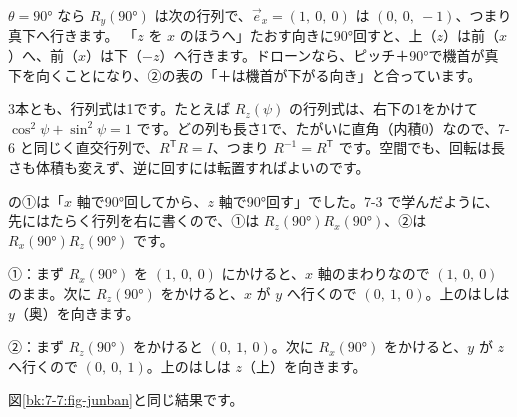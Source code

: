 $\theta=90°$ なら $R_y(90°)$ は次の行列で、$\vec e_x=(1,\ 0,\ 0)$ は $(0,\ 0,\ -1)$、つまり真下へ行きます。
「$z$ を $x$ のほうへ」たおす向きに90°回すと、上（$z$）は前（$x$）へ、前（$x$）は下（$-z$）へ行きます。ドローンなら、ピッチ＋90°で機首が真下を向くことになり、②の表の「＋は機首が下がる向き」と合っています。

\begin{seikaku}
3本とも、行列式は1です。たとえば $R_z(\psi)$ の行列式は、右下の1をかけて $\cos^2\psi+\sin^2\psi=1$ です。どの列も長さ1で、たがいに直角（内積0）なので、7-6 と同じく直交行列で、$R^{\mathsf T}R=I$、つまり $R^{-1}=R^{\mathsf T}$ です。空間でも、回転は長さも体積も変えず、逆に回すには転置すればよいのです。
\end{seikaku}


\label{bk:7-7:keisan}\bkhatenaref の①は「$x$ 軸で90°回してから、$z$ 軸で90°回す」でした。7-3 で学んだように、先にはたらく行列を右に書くので、①は $R_z(90°)R_x(90°)$、②は $R_x(90°)R_z(90°)$ です。

①：まず $R_x(90°)$ を $(1,\ 0,\ 0)$ にかけると、$x$ 軸のまわりなので $(1,\ 0,\ 0)$ のまま。次に $R_z(90°)$ をかけると、$x$ が $y$ へ行くので $(0,\ 1,\ 0)$。上のはしは $y$（奥）を向きます。\par
②：まず $R_z(90°)$ をかけると $(0,\ 1,\ 0)$。次に $R_x(90°)$ をかけると、$y$ が $z$ へ行くので $(0,\ 0,\ 1)$。上のはしは $z$（上）を向きます。\par
{}
図\ref{bk:7-7:fig-junban}と同じ結果です。

